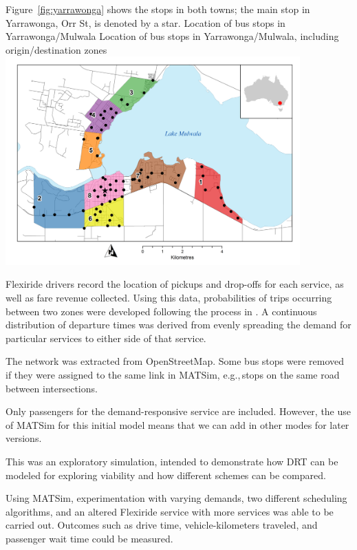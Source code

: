 Figure~\ref{fig:yarrawonga} shows the stops in both towns; the main stop in Yarrawonga, Orr St, is denoted by a star.
%
\createfigure%
{Location of bus stops in Yarrawonga/Mulwala}%
{Location of bus stops in Yarrawonga/Mulwala, including origin/destination zones}%
{\label{fig:yarrawonga}}%
{\includegraphics[width=0.85\textwidth, angle=0]{./using/figures/yarrawonga_high.png}}%
{}
%

Flexiride drivers record the location of pickups and drop-offs for each service,
as well as fare revenue collected. Using this data, probabilities of trips
occurring between two zones were developed following the process in
\citet[][]{Deflorio_ITSIET_2011}. A continuous distribution of departure times was
derived from evenly spreading the demand for particular services to either side
of that service. 


The network was extracted from OpenStreetMap. Some bus stops were removed if they were assigned to the same link in MATSim, e.g.,\,stops on the same road between intersections.

Only passengers for the demand-responsive service are included. However, the use of MATSim for this initial model means that we can add in other modes for later versions.


This was an exploratory simulation, intended to demonstrate how DRT can be modeled for exploring viability and how different schemes can be compared.

Using MATSim, experimentation with varying demands, two different scheduling
algorithms, and an altered Flexiride service with more services was able to be
carried out. Outcomes such as drive time, vehicle-kilometers traveled, and
passenger wait time could be measured.

